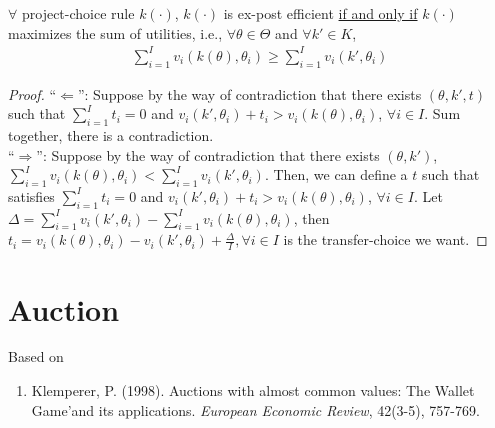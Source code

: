 \documentclass[11pt]{elegantbook}
\begin{document}
\begin{proposition}
    $\forall$ project-choice rule $k(\cdot)$, $k(\cdot)$ is ex-post efficient \underline{if and only if} $k(\cdot)$ maximizes the sum of utilities, i.e., $\forall \theta\in\Theta$ and $\forall k'\in K$,
    \begin{equation}
        \begin{aligned}
            \sum_{i=1}^I v_i(k(\theta),\theta_i)\geq \sum_{i=1}^I v_i(k',\theta_i)
        \end{aligned}
        \nonumber
    \end{equation}
\end{proposition}
\begin{proof}
    ``$\Leftarrow$'': Suppose by the way of contradiction that there exists $\left(\theta, k', t\right)$ such that $\sum_{i=1}^I t_i=0$ and $v_i(k',\theta_i)+t_i> v_i(k(\theta),\theta_i)$, $\forall i\in I$. Sum together, there is a contradiction.\\
    ``$\Rightarrow$'': Suppose by the way of contradiction that there exists $(\theta,k')$, $\sum_{i=1}^I v_i(k(\theta),\theta_i)<\sum_{i=1}^I v_i(k',\theta_i)$. Then, we can define a $t$ such that satisfies $\sum_{i=1}^I t_i=0$ and $v_i(k',\theta_i)+t_i> v_i(k(\theta),\theta_i)$, $\forall i\in I$. Let $\Delta=\sum_{i=1}^I v_i(k',\theta_i)-\sum_{i=1}^I v_i(k(\theta),\theta_i)$, then $t_i=v_i(k(\theta),\theta_i)-v_i(k',\theta_i)+\frac{\Delta}{I},\forall i\in I$ is the transfer-choice we want.
\end{proof}


























\section{Auction}
Based on
\begin{enumerate}[$\circ$]
    \item Klemperer, P. (1998). Auctions with almost common values: The Wallet Game'and its applications. \textit{European Economic Review}, 42(3-5), 757-769.
\end{enumerate}
\end{document}
